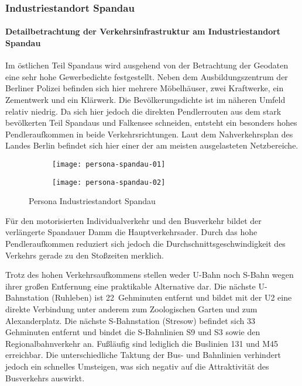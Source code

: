 \subsubsection{Industriestandort Spandau}
\paragraph{Detailbetrachtung der Verkehrsinfrastruktur am Industriestandort Spandau}
Im östlichen Teil Spandaus wird ausgehend von der Betrachtung der Geodaten eine sehr hohe Gewerbedichte festgestellt. Neben dem Ausbildungszentrum der Berliner Polizei befinden sich hier mehrere Möbelhäuser, zwei Kraftwerke, ein Zementwerk und ein Klärwerk. Die Bevölkerungsdichte ist im näheren Umfeld relativ niedrig. Da sich hier jedoch die direkten Pendlerrouten aus dem stark bevölkerten Teil Spandaus und Falkensee schneiden, entsteht ein besonders hohes Pendleraufkommen in beide Verkehrsrichtungen. Laut dem Nahverkehrsplan des Landes Berlin befindet sich hier einer der am meisten ausgelasteten Netzbereiche.

\begin{figure}
    \centering
    \begin{subfigure}{.5\textwidth}
        \centering
        \texttt{[image: persona-spandau-01]}
    \end{subfigure}%
    \begin{subfigure}{.5\textwidth}
        \centering
        \texttt{[image: persona-spandau-02]}
    \end{subfigure}
    \caption{Persona Industriestandort Spandau}
    \label{persona-spandau}
\end{figure}

Für den motorisierten Individualverkehr und den Busverkehr bildet der verlängerte Spandauer Damm die Hauptverkehrsader. Durch das hohe Pendleraufkommen reduziert sich jedoch die Durchschnittsgeschwindigkeit des Verkehrs gerade zu den Stoßzeiten merklich.

Trotz des hohen Verkehrsaufkommens stellen weder U-Bahn noch S-Bahn wegen ihrer großen Entfernung eine praktikable Alternative dar. Die nächste U-Bahnstation (Ruhleben) ist 22~Gehminuten entfernt und bildet mit der U2 eine direkte Verbindung unter anderem zum Zoologischen Garten und zum Alexanderplatz. Die nächste S-Bahnstation (Stresow) befindet sich 33 Gehminuten entfernt und bindet die S-Bahnlinien S9 und S3 sowie den Regionalbahnverkehr an. Fußläufig sind lediglich die Buslinien 131 und M45 erreichbar. Die unterschiedliche Taktung der Bus- und Bahnlinien verhindert jedoch ein schnelles Umsteigen, was sich negativ auf die Attraktivität des Busverkehrs auswirkt.

